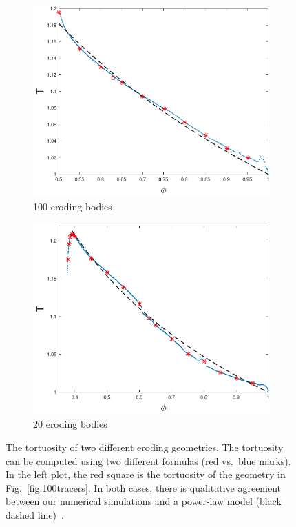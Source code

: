 \documentclass[11pt]{article}
\begin{document}
\begin{figure}[htp]
  \begin{center}
  \begin{subfigure}[b]{0.45\textwidth}
  \includegraphics[width=\textwidth]{figs/tort_eulerian100}
  \caption{100 eroding bodies}
  \end{subfigure}
  \begin{subfigure}[b]{0.45\textwidth}
  \includegraphics[width=\textwidth]{figs/tort_eulerian20}
  \caption{20 eroding bodies}
  \end{subfigure}
  \end{center}
  \caption{\label{fig:100tortuosity} The tortuosity of two different eroding geometries. The tortuosity can be computed using two different formulas (red vs.~blue marks). In the left plot, the red square is the tortuosity of the geometry in Fig.~\ref{fig:100tracers}. In both cases, there is qualitative agreement between our numerical simulations and a power-law model (black dashed line)~\cite{mat-kha-koz2008}.}
\end{figure}
\end{document}
